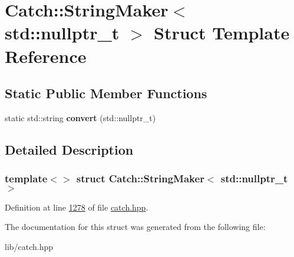 \hypertarget{structCatch_1_1StringMaker_3_01std_1_1nullptr__t_01_4}{}\section{Catch\+::String\+Maker$<$ std\+::nullptr\+\_\+t $>$ Struct Template Reference}
\label{structCatch_1_1StringMaker_3_01std_1_1nullptr__t_01_4}
\subsection*{Static Public Member Functions}
\begin{DoxyCompactItemize}
\item 
\mbox{\label{structCatch_1_1StringMaker_3_01std_1_1nullptr__t_01_4_a131fbb1f5cd68c93aaf30d34e3519e9c}} 
static std\+::string {\bfseries convert} (std\+::nullptr\+\_\+t)
\end{DoxyCompactItemize}


\subsection{Detailed Description}
\subsubsection*{template$<$$>$\newline
struct Catch\+::\+String\+Maker$<$ std\+::nullptr\+\_\+t $>$}



Definition at line \mbox{\hyperlink{catch_8hpp_source_l01278}{1278}} of file \mbox{\hyperlink{catch_8hpp_source}{catch.\+hpp}}.



The documentation for this struct was generated from the following file\+:\begin{DoxyCompactItemize}
\item 
lib/catch.\+hpp\end{DoxyCompactItemize}
